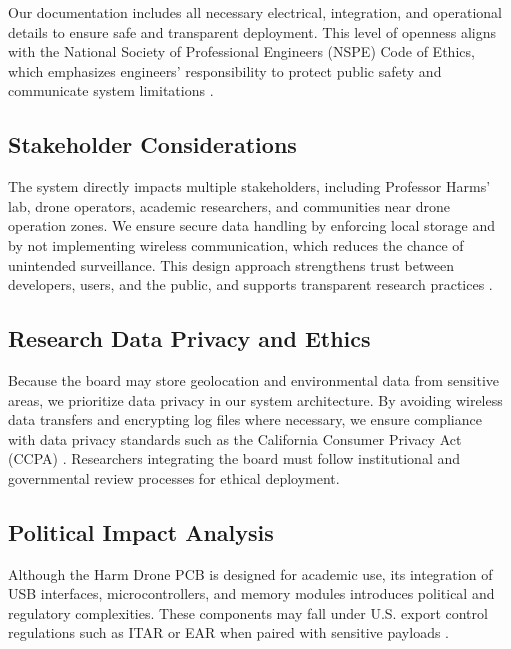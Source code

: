 \documentclass[12pt]{article}
\begin{document}
\par Our documentation includes all necessary electrical, integration, and operational details to ensure safe and transparent deployment. This level of openness aligns with the National Society of Professional Engineers (NSPE) Code of Ethics, which emphasizes engineers' responsibility to protect public safety and communicate system limitations \cite{nspe2020}.

\subsection{Stakeholder Considerations}

\par The system directly impacts multiple stakeholders, including Professor Harms' lab, drone operators, academic researchers, and communities near drone operation zones. We ensure secure data handling by enforcing local storage and by not implementing wireless communication, which reduces the chance of unintended surveillance. This design approach strengthens trust between developers, users, and the public, and supports transparent research practices \cite{ieee_ethics}.

\subsection{Research Data Privacy and Ethics}

\par Because the board may store geolocation and environmental data from sensitive areas, we prioritize data privacy in our system architecture. By avoiding wireless data transfers and encrypting log files where necessary, we ensure compliance with data privacy standards such as the California Consumer Privacy Act (CCPA) \cite{ccpa}. Researchers integrating the board must follow institutional and governmental review processes for ethical deployment.

\subsection{Political Impact Analysis}

\par Although the Harm Drone PCB is designed for academic use, its integration of USB interfaces, microcontrollers, and memory modules introduces political and regulatory complexities. These components may fall under U.S. export control regulations such as ITAR or EAR when paired with sensitive payloads \cite{ear}.
\end{document}
